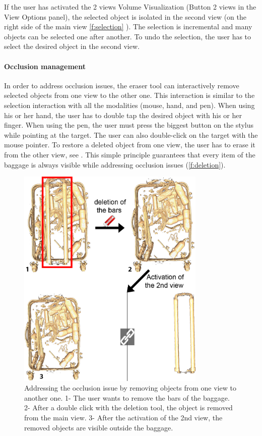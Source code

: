 If the user has activated the 2 views Volume Visualization (Button 2 views in the View Options panel), the selected object is isolated in the second view (on the right side of the main view \autoref{f:selection} ). The selection is incremental and many objects can be selected one after another. To undo the selection, the user has to select the desired object in the second view.

\paragraph{Occlusion management}

In order to address occlusion issues, the eraser tool can interactively remove selected objects from one view to the other one. This interaction is similar to the selection interaction with all the modalities (mouse, hand, and pen). When using his or her hand, the user has to double tap the desired object with his or her finger. When using the pen, the user must press the biggest button on the stylus while pointing at the target. The user can also double-click on the target with the mouse pointer. To restore a deleted object from one view, the user has to erase it from the other view, see \cite{hurter2017boolean}. This simple principle guarantees that every item of the baggage is always visible while addressing occlusion issues (\autoref{f:deletion}).

\begin{figure}
\centering   	\includegraphics[width=9cm]{Figures/deletion.png}
	\caption[ Addressing occlusion issue by removing objects from one view to another one.]{ Addressing the occlusion issue by removing objects from one view to another one. 1- The user wants to remove the bars of the baggage. 2- After a double click with the deletion tool, the object is removed from the main view. 3- After the activation of the 2nd view, the removed objects are visible outside the baggage.}
	\label{f:deletion}
\end{figure}

